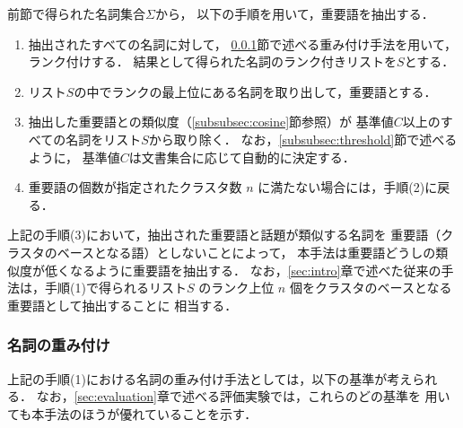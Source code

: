 \documentclass[japanese]{jnlp_1.4}
\begin{document}
前節で得られた名詞集合$\Sigma$から，
以下の手順を用いて，重要語を抽出する．
\begin{enumerate}
\item 抽出されたすべての名詞に対して，
  \ref{subsubsec:weight}節で述べる重み付け手法を用いて，ランク付けする．
  結果として得られた名詞のランク付きリストを$S$とする．
\item リスト$S$の中でランクの最上位にある名詞を取り出して，重要語とする．
\item 抽出した重要語との類似度（\ref{subsubsec:cosine}節参照）が
  基準値$C$以上のすべての名詞をリスト$S$から取り除く．
  なお，\ref{subsubsec:threshold}節で述べるように，
  基準値$C$は文書集合に応じて自動的に決定する．
\item 重要語の個数が指定されたクラスタ数 $n$ に満たない場合には，手順(2)に戻る．
\end{enumerate}
上記の手順(3)において，抽出された重要語と話題が類似する名詞を
重要語（クラスタのベースとなる語）としないことによって，
本手法は重要語どうしの類似度が低くなるように重要語を抽出する．
なお，\ref{sec:intro}章で述べた従来の手法は，手順(1)で得られるリスト$S$
のランク上位 $n$ 個をクラスタのベースとなる重要語として抽出することに
相当する．


\subsubsection{名詞の重み付け}\label{subsubsec:weight}

上記の手順(1)における名詞の重み付け手法としては，以下の基準が考えられる．
なお，\ref{sec:evaluation}章で述べる評価実験では，これらのどの基準を
用いても本手法のほうが優れていることを示す．
\end{document}
